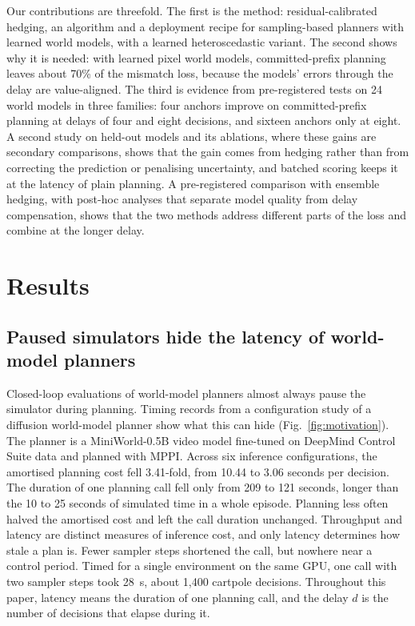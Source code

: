 \documentclass[pdflatex,sn-nature]{sn-jnl}%
\begin{document}
Our contributions are threefold. The first is the method: residual-calibrated hedging, an algorithm and a deployment recipe for sampling-based planners with learned world models, with a learned heteroscedastic variant. The second shows why it is needed: with learned pixel world models, committed-prefix planning leaves about 70\% of the mismatch loss, because the models' errors through the delay are value-aligned. The third is evidence from pre-registered tests on 24 world models in three families: four anchors improve on committed-prefix planning at delays of four and eight decisions, and sixteen anchors only at eight. A second study on held-out models and its ablations, where these gains are secondary comparisons, shows that the gain comes from hedging rather than from correcting the prediction or penalising uncertainty, and batched scoring keeps it at the latency of plain planning. A pre-registered comparison with ensemble hedging, with post-hoc analyses that separate model quality from delay compensation, shows that the two methods address different parts of the loss and combine at the longer delay.

\section{Results}\label{sec:results}

\subsection{Paused simulators hide the latency of world-model planners}\label{sec:motivation}

Closed-loop evaluations of world-model planners almost always pause the simulator during planning\cite{tassa2018dmc,maes2026swm,zhang2025worldinworld}. Timing records from a configuration study of a diffusion world-model planner show what this can hide (Fig.~\ref{fig:motivation}). The planner is a MiniWorld-0.5B video model\cite{zhao2026miniworld} fine-tuned on DeepMind Control Suite data and planned with MPPI\cite{williams2017mppi}. Across six inference configurations, the amortised planning cost fell 3.41-fold, from 10.44 to 3.06 seconds per decision. The duration of one planning call fell only from 209 to 121 seconds, longer than the 10 to 25 seconds of simulated time in a whole episode. Planning less often halved the amortised cost and left the call duration unchanged. Throughput and latency are distinct measures of inference cost\cite{reddi2019mlperf}, and only latency determines how stale a plan is. Fewer sampler steps\cite{song2021ddim} shortened the call, but nowhere near a control period. Timed for a single environment on the same GPU, one call with two sampler steps took 28~s, about 1,400 cartpole decisions. Throughout this paper, latency means the duration of one planning call, and the delay $d$ is the number of decisions that elapse during it.
\end{document}
